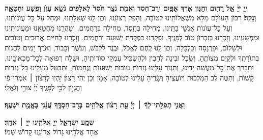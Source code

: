 \documentclass[twoside, openany, parskip=half, 11pt]{book}
\begin{document}
\begin{sometimes}

\\
 \textbf{יְיָ֣ יְיָ֔ אֵ֥ל רַח֖וּם וְחַנּ֑וּן אֶ֥רֶךְ אַפַּ֖יִם וְרַב־חֶ֥סֶד וֶאֱמֶֽת׃ נֹצֵ֥ר חֶ֙סֶד֙ לָאֲלָפִ֔ים נֹשֵׂ֥א עָוֺ֛ן וָפֶ֖שַׁע וְחַטָּאָ֑ה וְנַקֵּה֙׃}
רִבּוֺן הָעוׂלָם מַלֵּא מִשְׁאֲלוׂתֵֽינוּ לְטוׂבָה, וְהָפֵק רְצוׂנֵֽנוּ, וְתֶן לָֽנוּ שְׁאֵלָתֵֽנוּ, וּמְחַל עַל כׇּל־עֲוׂנוׂתֵֽנוּ, וְעַל כׇּל־עֲוׂנוׂת אַנְשֵׁי בָתֵּֽינוּ, מְחִילָה בְּחֶֽסֶד, מְחִילָה בְּרַחֲמִים, וְטַהֲרֵֽנוּ מֵחֲטָאֵֽנוּ וּמֵעֲוׂנוׂתֵֽינוּ וּמִפְּשָׁעֵֽינוּ, וְזׇכְרֵנוּ בְּזִכְרוׂן טוׂב לְפָנֶֽיךָ, וּפׇקְדֵֽנוּ בִּפְקֻדַּת יְשׁוּעָה וְרַחֲמִים, וְזׇכְרֵֽנוּ לְחַיִּים אֲרוּכִים וְטוׂבִים וּלְשָׁלוׂם, וּפַרְנָסָה וְכַלְכָּלָה, וְתֶן לָֽנוּ לֶֽחֶם לֶאֱכׂל, וּבֶֽגֶד לִלְבּׂשׁ, וְעׂשֶׁר וְכָבוׂד, וְאׂרֶךְ יָמִים לַהֲגוׂת בְּתוׂרָתֶֽךָ וּלְקַיֵּם מִצְוׂתֶֽהָ, וְשֵֽׂכֶל וּבִינָה לְהָבִין וּלְהַשְׂכִּיל עִמְקֵי סוׂדוׂתֶֽיהָ, וּשְׁלַח רְפוּאָה לְכׇל־מַכְאוׂבֵֽינוּ, וּתְבָרֵךְ אֶת־כׇּל־מַעֲשֵׁה יָדֵֽינוּ, וְתִגְזׂר עָלֵֽינוּ גְּזֵרוׂת טוׂבוׂת יְשׁוּעוׂת וְנֶחָמוׂת, וּתְבַטֵּל מֵעָלֵֽינוּ כׇּל־גְּזֵרוׂת קָשׁוׂת, וְתַטֶּה לֵב הַמַּלְכוּת וְיוׂעֲצֶֽיהָ וְשָׂרֶֽיהָ עָלֵֽינוּ לְטוׂבָה, אָמֵן וְכֵן יְהִי רָצוׂן׃
%
יִ֥הְיֽוּ לְרָצ֨וֹן ׀ אִמְרֵי־פִ֡י וְהֶגְי֣וֹן לִבִּ֣י לְפָנֶ֑יךָ יְ֝יָ֗ צוּרִ֥י וְגֹאֲלִֽי׃


\textbf{וַאֲנִ֤י תְפִלָּֽתִי־לְךָ֨ ׀ יְיָ֡ עֵ֤ת רָצ֗וֹן אֱלֹהִ֥ים בְּרׇב־חַסְדֶּ֑ךָ עֲ֝נֵ֗נִי בֶּאֱמֶ֥ת יִשְׁעֶֽךָ׃ }

\end{sometimes}

\brikhshmei

\textbf{שְׁמַ֖ע יִשְׂרָאֵ֑ל יְיָ֥ אֱלֹהֵ֖ינוּ יְיָ֥ ׀ אֶחָֽד׃}\\

אֶחָד אֱלֹהֵֽינוּ גָּדוֹל אֲדוֹנֵֽנוּ קָדוֹשׁ שְׁמוֹ׃

\gadlu

\label{al hakol}
\end{document}
